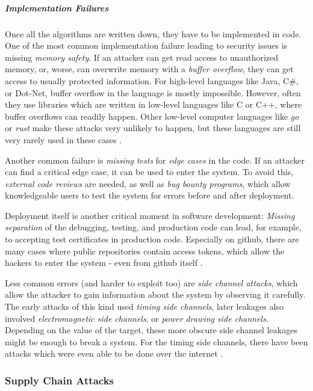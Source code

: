 \subparagraph{Implementation Failures}

Once all the algorithms are written down, they have to be implemented in code.
One of the most common implementation failure leading to security issues is missing
\emph{memory safety}.
If an attacker can get read access to unauthorized memory, or, worse, can overwrite
memory with a \emph{buffer overflow}, they can get access to usually protected
information.
For high-level languages like Java, C\#, or Dot-Net, buffer overflow in the language
is mostly impossible.
However, often they use libraries which are written in low-level languages like
C or C++, where buffer overflows can readily happen.
Other low-level computer languages like \emph{go} or \emph{rust} make these attacks very unlikely
to happen, but these languages are still very rarely used in these cases \cite{HeartbleedXKCD}.

Another common failure is \emph{missing tests} for \emph{edge cases} in the code.
If an attacker can find a critical edge case, it can be used to enter the system.
To avoid this, \emph{external code reviews} are needed, as well as \emph{bug bounty programs},
which allow knowledgeable users to test the system for errors before and after
deployment.

Deployment itself is another critical moment in software development:
\emph{Missing separation} of the debugging, testing, and production code can lead, for
example, to accepting test certificates in production code.
Especially on github, there are many cases where public repositories contain
access tokens, which allow the hackers to enter the system - even from
github itself \cite{GithubPrivate23}.

Less common errors (and harder to exploit too) are \emph{side channel attacks}, which allow the attacker to gain
information about the system by observing it carefully.
The early attacks of this kind used \emph{timing side channels}, later leakages also
involved \emph{electromagnetic side channels}, or \emph{power drawing side channels}.
Depending on the value of the target, these more obscure side channel leakages might 
be enough to break a system.
For the timing side channels, there have been attacks which were even able to be done
over the internet \cite{BB03}.

\subsubsection{Supply Chain Attacks}

